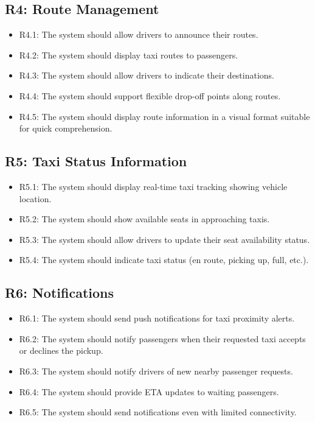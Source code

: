 \documentclass[a4paper,12pt]{article}
\begin{document}
\subsection*{R4: Route Management}
\begin{itemize}
    \item R4.1: The system should allow drivers to announce their routes.
    \item R4.2: The system should display taxi routes to passengers.
    \item R4.3: The system should allow drivers to indicate their destinations.
    \item R4.4: The system should support flexible drop-off points along routes.
    \item R4.5: The system should display route information in a visual format suitable for quick comprehension.
\end{itemize}

\subsection*{R5: Taxi Status Information}
\begin{itemize}
    \item R5.1: The system should display real-time taxi tracking showing vehicle location.
    \item R5.2: The system should show available seats in approaching taxis.
    \item R5.3: The system should allow drivers to update their seat availability status.
    \item R5.4: The system should indicate taxi status (en route, picking up, full, etc.).
\end{itemize}

\subsection*{R6: Notifications}
\begin{itemize}
    \item R6.1: The system should send push notifications for taxi proximity alerts.
    \item R6.2: The system should notify passengers when their requested taxi accepts or declines the pickup.
    \item R6.3: The system should notify drivers of new nearby passenger requests.
    \item R6.4: The system should provide ETA updates to waiting passengers.
    \item R6.5: The system should send notifications even with limited connectivity.
\end{itemize}
\end{document}
